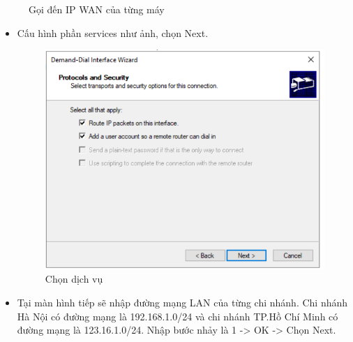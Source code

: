      \begin{figure}[htbp]
            \hfill
            \hfill
            \caption{Gọi đến IP WAN của từng máy}
        \end{figure}
    \begin{itemize}

        \item Cấu hình phần services như ảnh, chọn Next.
        \newpage
        \begin{figure}[htbp]
            \centering
            \includegraphics[width=0.6\linewidth]{SiteToSiteImg/conf9_afterCall.png}
            \caption{Chọn dịch vụ}
            \end{figure}
        \item Tại màn hình tiếp sẽ nhập đường mạng LAN của từng chi nhánh. Chi nhánh Hà Nội có đường mạng là 192.168.1.0/24 và chi nhánh TP.Hồ Chí Minh có đường mạng là 123.16.1.0/24. Nhập bước nhảy là 1 -> OK -> Chọn Next.
        
    \end{itemize}
